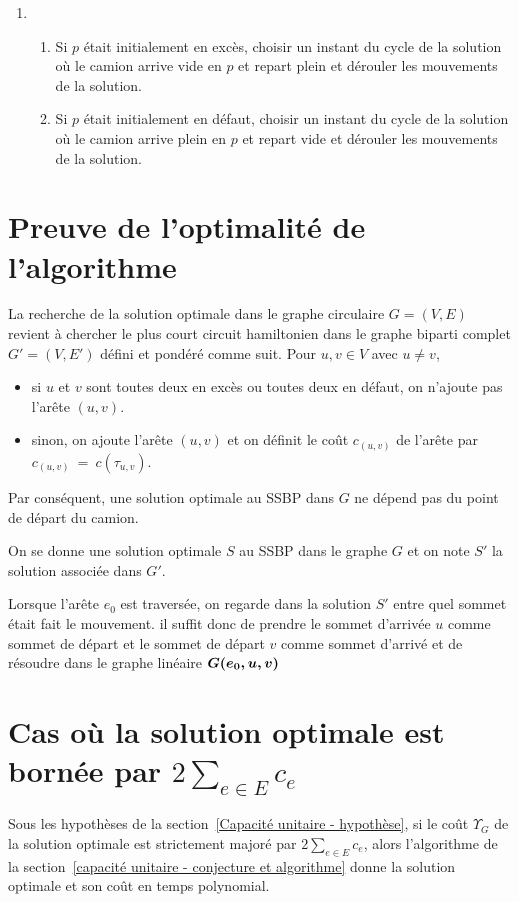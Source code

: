 \begin{enumerate}
\begin{enumerate}
  \item \begin{enumerate}
    \item Si $p$ était initialement en excès, choisir un instant du cycle de la solution où le camion arrive vide en $p$ et repart plein et dérouler les mouvements de la solution.
    \item Si $p$ était initialement en défaut, choisir un instant du cycle de la solution où le camion arrive plein en $p$ et repart vide et dérouler les mouvements de la solution.
    \end{enumerate}
  \end{enumerate}
\end{enumerate}


\section{Preuve de l'optimalité de l'algorithme}
\label{Capicité unitaire preuve}

La recherche de la solution optimale dans le graphe circulaire $G=(V,E)$ revient à chercher le plus court circuit hamiltonien dans le graphe biparti complet $G'=(V,E')$ défini et pondéré comme suit. Pour $u,v \in V$ avec $u \ne v$,
\begin{itemize}
\item si $u$ et $v$ sont toutes deux en excès ou toutes deux en défaut, on n'ajoute pas l'arête $(u,v)$.
\item sinon, on ajoute l'arête $(u,v)$ et on définit le coût $c_{(u,v)}$ de l'arête par  $c_{(u,v)}~=~c(\tau_{u,v})$.
\end{itemize}
Par conséquent, une solution optimale au SSBP dans $G$ ne dépend pas du point de départ du camion.

On se donne une solution optimale $S$ au SSBP dans le graphe $G$ et on note $S'$ la solution associée dans $G'$.

Lorsque l'arête $e_0$ est traversée, on regarde dans la solution $S'$ entre quel sommet était fait le mouvement. il suffit donc de prendre le sommet d'arrivée $u$ comme sommet de départ et le sommet de départ $v$ comme sommet d'arrivé et de résoudre dans le graphe linéaire $\boldsymbol{G(e_0,u,v)}$


\section{Cas où la solution optimale est bornée par $2\sum_{e \in E}c_e$}

\begin{prop}
Sous les hypothèses de la section~\ref{Capacité unitaire - hypothèse}, si le coût $\Upsilon_G$ de la solution optimale est strictement majoré par $2\sum_{e \in E}c_e$, alors l'algorithme de la section~\ref{capacité unitaire - conjecture et algorithme} donne la solution optimale et son coût en temps polynomial.
\end{prop}

